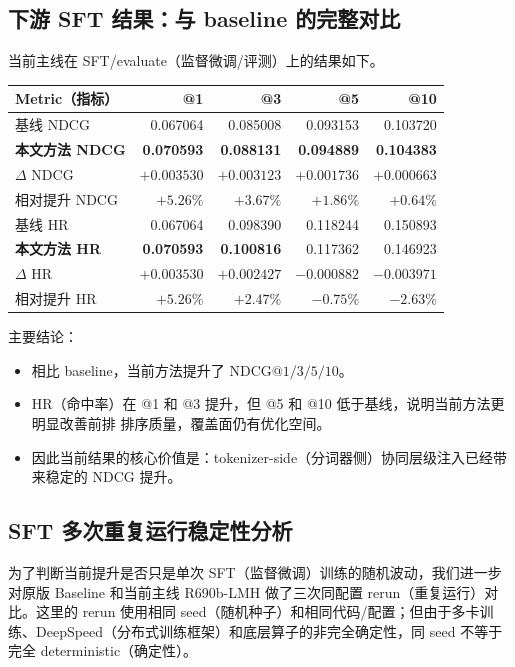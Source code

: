 \documentclass[11pt]{article}
\begin{document}
\subsection{下游 SFT 结果：与 baseline 的完整对比}

当前主线在 SFT/evaluate（监督微调/评测）上的结果如下。

\begin{center}
\begin{tabular}{lrrrr}
\toprule
Metric（指标） & @1 & @3 & @5 & @10 \\
\midrule
基线 NDCG & 0.067064 & 0.085008 & 0.093153 & 0.103720 \\
\textbf{本文方法 NDCG} & \textbf{0.070593} & \textbf{0.088131} & \textbf{0.094889} & \textbf{0.104383} \\
$\Delta$ NDCG & $+0.003530$ & $+0.003123$ & $+0.001736$ & $+0.000663$ \\
相对提升 NDCG & $+5.26\%$ & $+3.67\%$ & $+1.86\%$ & $+0.64\%$ \\
\midrule
基线 HR & 0.067064 & 0.098390 & 0.118244 & 0.150893 \\
\textbf{本文方法 HR} & \textbf{0.070593} & \textbf{0.100816} & 0.117362 & 0.146923 \\
$\Delta$ HR & $+0.003530$ & $+0.002427$ & $-0.000882$ & $-0.003971$ \\
相对提升 HR & $+5.26\%$ & $+2.47\%$ & $-0.75\%$ & $-2.63\%$ \\
\bottomrule
\end{tabular}
\end{center}

主要结论：

\begin{itemize}
  \item 相比 baseline，当前方法提升了 $\mathrm{NDCG@1/3/5/10}$。
  \item HR（命中率）在 @1 和 @3 提升，但 @5 和 @10 低于基线，说明当前方法更明显改善前排 排序质量，覆盖面仍有优化空间。
  \item 因此当前结果的核心价值是：tokenizer-side（分词器侧）协同层级注入已经带来稳定的 NDCG 提升。
\end{itemize}

\subsection{SFT 多次重复运行稳定性分析}

为了判断当前提升是否只是单次 SFT（监督微调）训练的随机波动，我们进一步对原版 Baseline 和当前主线 R690b-LMH 做了三次同配置 rerun（重复运行）对比。这里的 rerun 使用相同 seed（随机种子）和相同代码/配置；但由于多卡训练、DeepSpeed（分布式训练框架）和底层算子的非完全确定性，同 seed 不等于完全 deterministic（确定性）。
\end{document}

